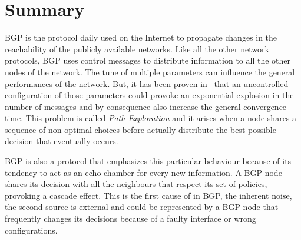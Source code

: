 \chapter*{Summary} %
\label{cha:summary}




\ac{BGP} is the protocol daily used on the Internet to propagate changes in the
reachability of the publicly available networks.
Like all the other network protocols, \ac{BGP} uses control messages to distribute
information to all the other nodes of the network.
The tune of multiple parameters can influence the general performances of the
network.
But, it has been proven in~\cite{fabrikant2011there} that an uncontrolled configuration
of those parameters could provoke an exponential explosion in the number of messages
and by consequence also increase the general convergence time.
This problem is called \textit{Path Exploration} and it arises when a node shares
a sequence of non-optimal choices before actually distribute the best possible
decision that eventually occurs.

\ac{BGP} is also a protocol that emphasizes this particular behaviour because of
its tendency to act as an echo-chamber for every new information.
A \ac{BGP} node shares its decision with all the neighbours that respect
its set of policies, provoking a cascade effect.
This is the first cause of  in \ac{BGP}, the inherent noise, the second
source is external and could be represented by a \ac{BGP} node that frequently
changes its decisions because of a faulty interface or wrong configurations.


